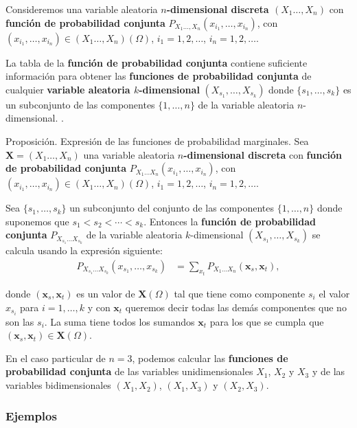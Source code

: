 \documentclass[]{book}
\begin{document}
Consideremos una variable aleatoria \textbf{\(n\)-dimensional discreta \((X_1\ldots,X_n)\)} con \textbf{función de probabilidad conjunta} \(P_{X_1\ldots,X_n}(x_{i_1},\ldots,x_{i_n})\), con \((x_{i_1},\ldots,x_{i_n})\in (X_1\ldots,X_n)(\Omega)\), \(i_1=1,2,\ldots\), \(i_n=1,2,\ldots\).

La tabla de la \textbf{función de probabilidad conjunta} contiene suficiente información para obtener las \textbf{funciones de probabilidad conjunta} de cualquier \textbf{variable aleatoria \(k\)-dimensional} \((X_{s_1},\ldots,X_{s_k})\) donde \(\{s_1,\ldots,s_k\}\) es un subconjunto de las componentes \(\{1,\ldots,n\}\) de la variable aleatoria \(n\)-dimensional. .

Proposición. Expresión de las funciones de probabilidad marginales.
Sea \(\mathbf{X}=(X_1\ldots,X_n)\) una variable aleatoria \textbf{\(n\)-dimensional discreta} con \textbf{función de probabilidad conjunta} \(P_{X_1\ldots X_n}(x_{i_1},\ldots,x_{i_n})\), con \((x_{i_1},\ldots,x_{i_n})\in (X_1\ldots,X_n)(\Omega)\), \(i_1=1,2,\ldots\), \(i_n=1,2,\ldots\).

Sea \(\{s_1,\ldots,s_k\}\) un subconjunto del conjunto de las componentes \(\{1,\ldots,n\}\) donde suponemos que \(s_1 < s_2<\cdots < s_k\). Entonces la \textbf{función de probabilidad conjunta} \(P_{X_{s_1}\ldots X_{s_k}}\) de la variable aleatoria \(k\)-dimensional \((X_{s_1},\ldots, X_{s_k})\) se calcula usando la expresión siguiente:
\[
\begin{array}{rl}
P_{X_{s_1}\ldots X_{s_k}}(x_{s_1},\ldots,x_{s_k})  & = \sum_{x_t} P_{X_1\ldots X_n}(\mathbf{x}_s,\mathbf{x}_t),
\end{array}
\]

donde \((\mathbf{x}_s,\mathbf{x}_t)\) es un valor de \(\mathbf{X}(\Omega)\) tal que tiene como componente \(s_i\) el valor \(x_{s_i}\) para \(i=1,\ldots, k\) y con \(\mathbf{x}_t\) queremos decir todas las demás componentes que no son las \(s_i\). La suma tiene todos los sumandos \(\mathbf{x}_t\) para los que se cumpla que \((\mathbf{x}_s,\mathbf{x}_t)\in \mathbf{X}(\Omega)\).

En el caso particular de \(n=3\), podemos calcular las \textbf{funciones de probabilidad conjunta} de las variables unidimensionales \(X_1\), \(X_2\) y \(X_3\) y de las variables bidimensionales \((X_1,X_2)\), \((X_1,X_3)\) y \((X_2,X_3)\).

\hypertarget{ejemplos-11}{%
\subsubsection{Ejemplos}\label{ejemplos-11}}
\end{document}
